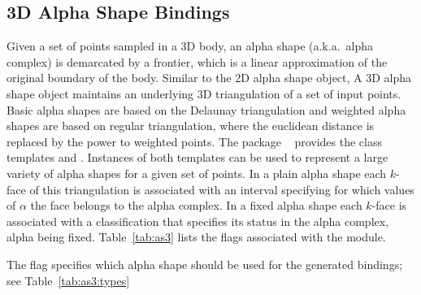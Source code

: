 \subsection{3D Alpha Shape Bindings}
\label{ssec:modules:as3}
Given a set of points sampled in a 3D body, an alpha shape
(a.k.a.\ alpha complex) is demarcated by a frontier, which is a linear
approximation of the original boundary of the body. Similar to the 2D
alpha shape object, A 3D alpha shape object maintains an underlying 3D
triangulation of a set of input points. Basic alpha shapes are based
on the Delaunay triangulation and weighted alpha shapes are based on
regular triangulation, where the euclidean distance is replaced by the
power to weighted points. The package
\iiiDAlphaShapesPackage{}~\cite{cgal:dy-as3-21a} provides the class
templates 
and . Instances of both
templates can be used to represent a large variety of alpha shapes for
a given set of points. In a plain alpha shape each $k$-face of this
triangulation is associated with an interval specifying for which
values of $\alpha$ the face belongs to the alpha complex. In a fixed
alpha shape each $k$-face is associated with a classification that
specifies its status in the alpha complex, alpha being
fixed. Table~\ref{tab:as3} lists the \cmake{} flags associated with
the \iiiDAlphaShapesPackage{} module.

\begin{table}[!htp]
  \caption{\iiiDAlphaShapesPackage{} module flags}
  \centering{}
 \label{tab:as3}
\end{table}

The \cmake{} flag  specifies which alpha shape
should be used for the generated bindings; see
Table~\ref{tab:as3:types}

